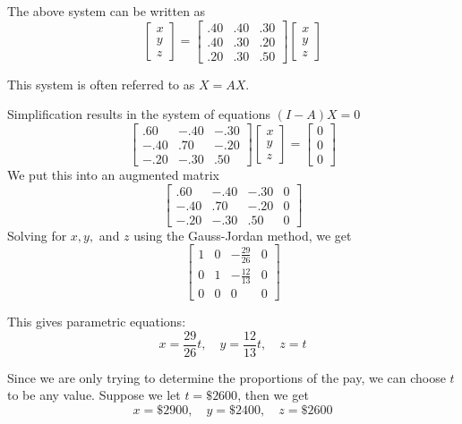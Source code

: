 \begin{solution}
    The above system can be written as
    \[ \begin{bmatrix}
            x \\
            y \\
            z
        \end{bmatrix} = \begin{bmatrix}
            .40 & .40 & .30 \\
            .40 & .30 & .20 \\
            .20 & .30 & .50
        \end{bmatrix} \begin{bmatrix}
            x \\
            y \\
            z
        \end{bmatrix} \]

    This system is often referred to as \( X = AX \).

    Simplification results in the system of equations \( (I - A)X = 0 \)
    \[ \begin{bmatrix}
            .60  & -.40 & -.30 \\
            -.40 & .70  & -.20 \\
            -.20 & -.30 & .50
        \end{bmatrix} \begin{bmatrix}
            x \\
            y \\
            z
        \end{bmatrix} = \begin{bmatrix}
            0 \\
            0 \\
            0
        \end{bmatrix} \]
    We put this into an augmented matrix
    \[
        \left[\begin{array}{ccc|c}
                .60  & -.40 & -.30 & 0 \\
                -.40 & .70  & -.20 & 0 \\
                -.20 & -.30 & .50  & 0
            \end{array}\right]
    \]
    Solving for \( x, y, \) and \( z \) using the Gauss-Jordan method, we get
    \[
        \left[\begin{array}{ccc|c}
                1 & 0 & -\frac{29}{26} & 0 \\
                0 & 1 & -\frac{12}{13} & 0 \\
                0 & 0 & 0              & 0
            \end{array}\right]
    \]

    This gives parametric equations:
    \[ x = \frac{29}{26} t, \quad y = \frac{12}{13} t, \quad z = t \]

    Since we are only trying to determine the proportions of the pay, we can choose \( t \) to be any value. Suppose we let \( t = \$2600 \), then we get
    \[ x = \$2900, \quad y = \$2400, \quad z = \$2600 \]

\end{solution}

